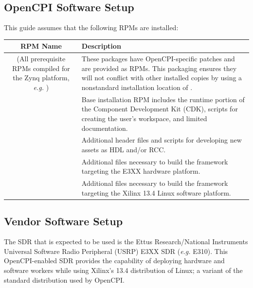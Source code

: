 \subsection{OpenCPI Software Setup}
\begin{flushleft}
This guide assumes that the following RPMs are installed:  \\
\begin{table}[H]

		\label{table:rpms}
			\begin{tabularx}{\textwidth}{|C|X|}
			\hline
			\textbf{RPM Name} & \textbf{Description} \\
			\hline
			(All prerequisite RPMs compiled for the Zynq platform, \textit{e.g.} ) & These packages have OpenCPI-specific patches and are provided as RPMs. This packaging ensures they will not conflict with other installed copies by using a nonstandard installation location of . \\
		    \hline
		     & Base installation RPM includes the runtime portion of the Component Development Kit (CDK), scripts for creating the user's workspace, and limited documentation. \\
		    \hline
		     & Additional header files and scripts for developing new assets as HDL and/or RCC. \\
		    \hline
		     & Additional files necessary to build the framework targeting the E3XX hardware platform. \\
		    \hline
		     & Additional files necessary to build the framework targeting the Xilinx 13.4 Linux software platform. \\
		    \hline
			\end{tabularx}
\end{table}
\subsection{Vendor Software Setup}
The SDR that is expected to be used is the Ettus Research/National Instruments Universal Software Radio Peripheral (USRP) E3XX SDR (\textit{e.g.} E310). This OpenCPI-enabled SDR provides the capability of deploying hardware and software workers while using Xilinx's 13.4 distribution of Linux; a variant of the standard distribution used by OpenCPI.\\ \bigskip


\end{flushleft}
